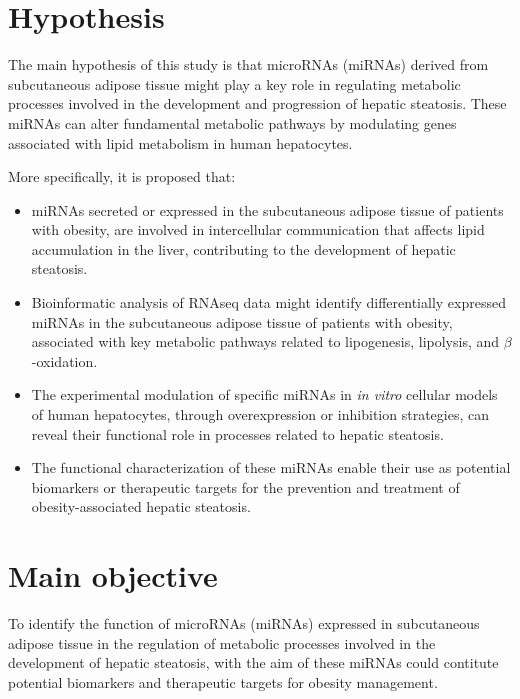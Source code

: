 \documentclass[
  11pt,
  letterpaper,
]{book}
\providecommand{\tightlist}{%
  \setlength{\itemsep}{0pt}\setlength{\parskip}{0pt}}\usepackage{longtable,booktabs,array}
\begin{document}
\section{Hypothesis}\label{hypothesis}

The main hypothesis of this study is that microRNAs (miRNAs) derived
from subcutaneous adipose tissue might play a key role in regulating
metabolic processes involved in the development and progression of
hepatic steatosis. These miRNAs can alter fundamental metabolic pathways
by modulating genes associated with lipid metabolism in human
hepatocytes.

More specifically, it is proposed that:

\begin{itemize}
\tightlist
\item
  miRNAs secreted or expressed in the subcutaneous adipose tissue of
  patients with obesity, are involved in intercellular communication
  that affects lipid accumulation in the liver, contributing to the
  development of hepatic steatosis.\\
\item
  Bioinformatic analysis of RNAseq data might identify differentially
  expressed miRNAs in the subcutaneous adipose tissue of patients with
  obesity, associated with key metabolic pathways related to
  lipogenesis, lipolysis, and \(\beta\)-oxidation.\\
\item
  The experimental modulation of specific miRNAs in \emph{in vitro}
  cellular models of human hepatocytes, through overexpression or
  inhibition strategies, can reveal their functional role in processes
  related to hepatic steatosis.\\
\item
  The functional characterization of these miRNAs enable their use as
  potential biomarkers or therapeutic targets for the prevention and
  treatment of obesity-associated hepatic steatosis.
\end{itemize}

\section{Main objective}\label{main-objective}

To identify the function of microRNAs (miRNAs) expressed in subcutaneous
adipose tissue in the regulation of metabolic processes involved in the
development of hepatic steatosis, with the aim of these miRNAs could
contitute potential biomarkers and therapeutic targets for obesity
management.
\end{document}
